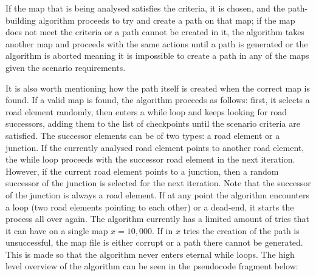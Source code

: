 If the map that is being analysed satisfies the criteria, it is chosen, and the path-building algorithm proceeds to try and create a path on that map; if the map does not meet the criteria or a path cannot be created in it, the algorithm takes another map and proceeds with the same actions until a path is generated or the algorithm is aborted meaning it is impossible to create a path in any of the maps given the scenario requirements.

It is also worth mentioning how the path itself is created when the correct map is found. If a valid map is found, the algorithm proceeds as follows: first, it selects a road element randomly, then enters a while loop and keeps looking for road successors, adding them to the list of checkpoints until the scenario criteria are satisfied. The successor elements can be of two types: a road element or a junction. If the currently analysed road element points to another road element, the while loop proceeds with the successor road element in the next iteration. However, if the current road element points to a junction, then a random successor of the junction is selected for the next iteration. Note that the successor of the junction is always a road element. If at any point the algorithm encounters a loop (two road elements pointing to each other) or a dead-end, it starts the process all over again. The algorithm currently has a limited amount of tries that it can have on a single map $x = 10,000$. If in $x$ tries the creation of the path is unsuccessful, the map file is either corrupt or a path there cannot be generated. This is made so that the algorithm never enters eternal while loops. The high level overview of the algorithm can be seen in the pseudocode fragment below:

